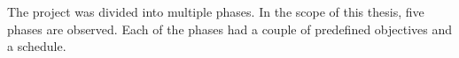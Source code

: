 The project was divided into multiple phases. In the scope of this thesis, five phases are observed. Each of the phases had a couple of predefined objectives and a schedule.










